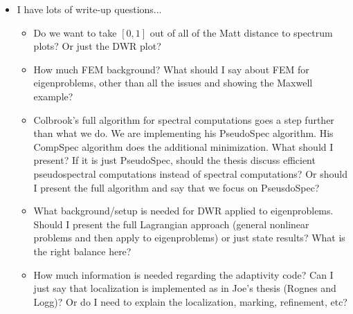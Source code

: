 \documentclass[12pt,a4paper]{article}
\begin{document}
\begin{itemize}
    \item I have lots of write-up questions...
    \begin{itemize}
        \item Do we want to take $[0, 1]$ out of all of the Matt distance to spectrum plots? Or just the DWR plot? 
        \item How much FEM background? What should I say about FEM for eigenproblems, other than all the issues and showing the Maxwell example?
        \item Colbrook's full algorithm for spectral computations goes a step further than what we do. We are implementing his PseudoSpec algorithm. His CompSpec algorithm does the additional minimization. What should I present? If it is just PseudoSpec, should the thesis discuss efficient pseudospectral computations instead of spectral computations? Or should I present the full algorithm and say that we focus on PseusdoSpec?
        \item What background/setup is needed for DWR applied to eigenproblems. Should I present the full Lagrangian approach (general nonlinear problems and then apply to eigenproblems) or just state results? What is the right balance here? 
        \item How much information is needed regarding the adaptivity code? Can I just say that localization is implemented as in Joe's thesis (Rognes and Logg)? Or do I need to explain the localization, marking, refinement, etc? 
    \end{itemize}
\end{itemize}
\end{document}
